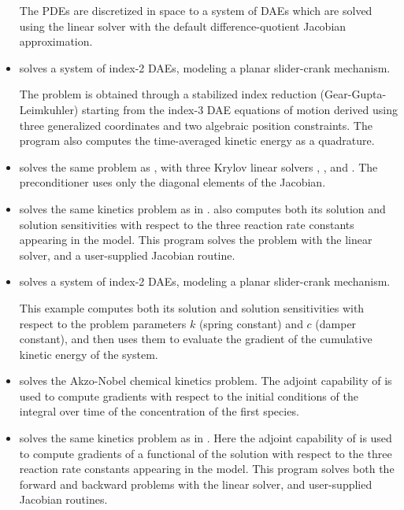 \begin{itemize}
  The PDEs are discretized in space to a system of DAEs which are solved
  using the {\idaband} linear solver with the default difference-quotient 
  Jacobian approximation.

\item {}
  solves a system of index-2 DAEs, modeling a planar slider-crank mechanism.

  The problem is obtained through a stabilized index reduction (Gear-Gupta-Leimkuhler)
  starting from the index-3 DAE equations of motion derived using three generalized
  coordinates and two algebraic position constraints.
  The program also computes the time-averaged kinetic energy as a quadrature.

\item {}
  solves the same problem as , with three Krylov linear solvers
  {\idaspgmr}, {\idaspbcg}, and {\idasptfqmr}.  The preconditioner uses only
  the diagonal elements of the Jacobian.


\item {}
  solves the same kinetics problem as in .
  \newline
  {\idas} also computes both its solution and solution sensitivities with respect
  to the three reaction rate constants appearing in the model. 
  This program solves the problem with the {\idadense} linear solver, and a 
  user-supplied Jacobian routine.

\item {}
  solves a system of index-2 DAEs, modeling a planar slider-crank mechanism.

  This example computes both its solution and solution sensitivities with respect
  to the problem parameters $k$ (spring constant) and $c$ (damper constant), 
  and then uses them to evaluate the gradient of the cumulative kinetic energy
  of the system.


\item {}
  solves the Akzo-Nobel chemical kinetics problem.
  \newline
  The adjoint capability of {\idas} is used to compute gradients with
  respect to the initial conditions of the integral over time of the 
  concentration of the first species.

\item {}
  solves the same kinetics problem as in .
  \newline
  Here the adjoint capability of {\idas} is used to compute gradients
  of a functional of the solution with respect to the three
  reaction rate constants appearing in the model.
  This program solves both the forward and backward problems with the 
  {\idadense} linear solver, and user-supplied Jacobian routines.


\end{itemize}
